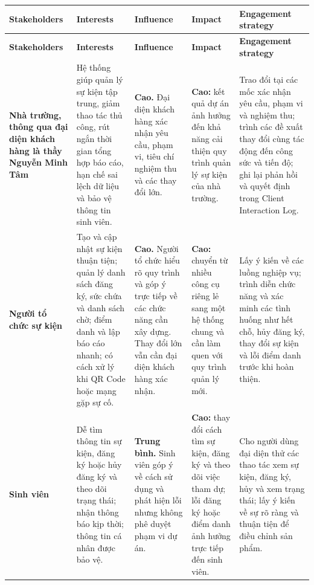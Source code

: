 \begingroup
\scriptsize
\setlength{\tabcolsep}{2pt}
\setlength{\parskip}{0pt}
\renewcommand{\arraystretch}{1.18}
\begin{longtable}{>{\RaggedRight\arraybackslash}p{}
                  >{\RaggedRight\arraybackslash}p{}
                  >{\RaggedRight\arraybackslash}p{}
                  >{\RaggedRight\arraybackslash}p{}
                  >{\RaggedRight\arraybackslash}p{}}
\rowcolor{headerblue}
\color{white}\textbf{Stakeholders} &
\color{white}\textbf{Interests} &
\color{white}\textbf{Influence} &
\color{white}\textbf{Impact} &
\color{white}\textbf{Engagement strategy} \\
\endfirsthead

\rowcolor{headerblue}
\color{white}\textbf{Stakeholders} &
\color{white}\textbf{Interests} &
\color{white}\textbf{Influence} &
\color{white}\textbf{Impact} &
\color{white}\textbf{Engagement strategy} \\
\endhead

\rowcolor{lightgray}
\textbf{Nhà trường, thông qua đại diện khách hàng là thầy Nguyễn Minh Tâm} &
Hệ thống giúp quản lý sự kiện tập trung, giảm thao tác thủ công, rút ngắn thời gian tổng hợp báo cáo, hạn chế sai lệch dữ liệu và bảo vệ thông tin sinh viên. &
\textbf{Cao.} Đại diện khách hàng xác nhận yêu cầu, phạm vi, tiêu chí nghiệm thu và các thay đổi lớn. &
\textbf{Cao:} kết quả dự án ảnh hưởng đến khả năng cải thiện quy trình quản lý sự kiện của nhà trường. &
Trao đổi tại các mốc xác nhận yêu cầu, phạm vi và nghiệm thu; trình các đề xuất thay đổi cùng tác động đến công sức và tiến độ; ghi lại phản hồi và quyết định trong Client Interaction Log. \\

\textbf{Người tổ chức sự kiện} &
Tạo và cập nhật sự kiện thuận tiện; quản lý danh sách đăng ký, sức chứa và danh sách chờ; điểm danh và lập báo cáo nhanh; có cách xử lý khi QR Code hoặc mạng gặp sự cố. &
\textbf{Cao.} Người tổ chức hiểu rõ quy trình và góp ý trực tiếp về các chức năng cần xây dựng. Thay đổi lớn vẫn cần đại diện khách hàng xác nhận. &
\textbf{Cao:} chuyển từ nhiều công cụ riêng lẻ sang một hệ thống chung và cần làm quen với quy trình quản lý mới. &
Lấy ý kiến về các luồng nghiệp vụ; trình diễn chức năng và xác minh các tình huống như hết chỗ, hủy đăng ký, thay đổi sự kiện và lỗi điểm danh trước khi hoàn thiện. \\

\rowcolor{lightgray}
\textbf{Sinh viên} &
Dễ tìm thông tin sự kiện, đăng ký hoặc hủy đăng ký và theo dõi trạng thái; nhận thông báo kịp thời; thông tin cá nhân được bảo vệ. &
\textbf{Trung bình.} Sinh viên góp ý về cách sử dụng và phát hiện lỗi nhưng không phê duyệt phạm vi dự án. &
\textbf{Cao:} thay đổi cách tìm sự kiện, đăng ký và theo dõi việc tham dự; lỗi đăng ký hoặc điểm danh ảnh hưởng trực tiếp đến sinh viên. &
Cho người dùng đại diện thử các thao tác xem sự kiện, đăng ký, hủy và xem trạng thái; lấy ý kiến về sự rõ ràng và thuận tiện để điều chỉnh sản phẩm. \\


\end{longtable}

